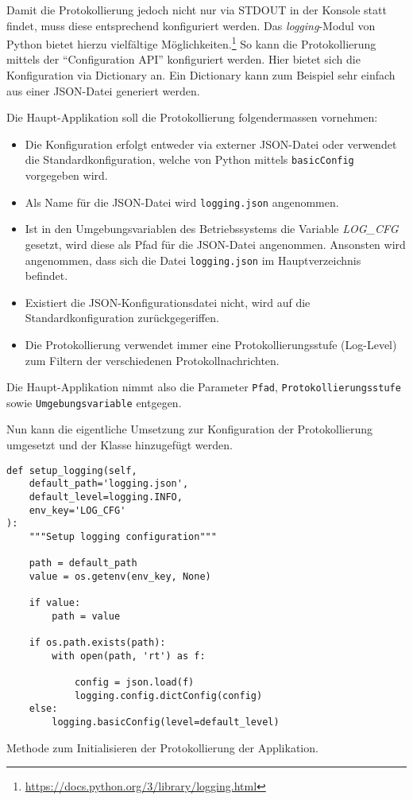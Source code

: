 \documentclass[10pt, openright, notitlepage]{scrreprt}
\begin{document}
Damit die Protokollierung jedoch nicht nur via STDOUT in der Konsole statt
findet, muss diese entsprechend konfiguriert werden. Das \emph{logging}-Modul von
Python bietet hierzu vielfältige
Möglichkeiten.\footnote{\url{https://docs.python.org/3/library/logging.html}} So kann die
Protokollierung mittels der ``Configuration API'' konfiguriert werden. Hier
bietet sich die Konfiguration via Dictionary an. Ein Dictionary kann zum
Beispiel sehr einfach aus einer JSON-Datei generiert werden.

Die Haupt-Applikation soll die Protokollierung folgendermassen vornehmen:
\begin{itemize}
\item Die Konfiguration erfolgt entweder via externer JSON-Datei oder verwendet die
Standardkonfiguration, welche von Python mittels \texttt{basicConfig} vorgegeben
wird.
\item Als Name für die JSON-Datei wird \texttt{logging.json} angenommen.
\item Ist in den Umgebungsvariablen des Betriebssystems die Variable \emph{LOG\_CFG}
gesetzt, wird diese als Pfad für die JSON-Datei angenommen. Ansonsten wird
angenommen, dass sich die Datei \texttt{logging.json} im Hauptverzeichnis befindet.
\item Existiert die JSON-Konfigurationsdatei nicht, wird auf die
Standardkonfiguration zurückgegeriffen.
\item Die Protokollierung verwendet immer eine Protokollierungsstufe (Log-Level)
zum Filtern der verschiedenen Protokollnachrichten.
\end{itemize}

Die Haupt-Applikation nimmt also die Parameter \texttt{Pfad}, \texttt{Protokollierungsstufe}
sowie \texttt{Umgebungsvariable} entgegen.

Nun kann die eigentliche Umsetzung zur Konfiguration der Protokollierung
umgesetzt und der Klasse hinzugefügt werden.

\begin{listing}[H]
\begin{verbatim}
def setup_logging(self,
    default_path='logging.json',
    default_level=logging.INFO,
    env_key='LOG_CFG'
):
    """Setup logging configuration"""

    path = default_path
    value = os.getenv(env_key, None)

    if value:
        path = value

    if os.path.exists(path):
        with open(path, 'rt') as f:

            config = json.load(f)
            logging.config.dictConfig(config)
    else:
        logging.basicConfig(level=default_level)
\end{verbatim}
\caption{\label{org183d1e4}
Methode zum Initialisieren der Protokollierung der Applikation.}
\end{listing}
\end{document}
